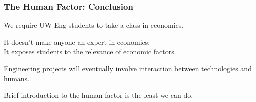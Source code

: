 \begin{frame}
\frametitle{The Human Factor: Conclusion}
\begin{changemargin}{1cm}

We require UW Eng students to take a class in economics.

It doesn't make anyone an expert in economics;\\
\quad It exposes students to the relevance of economic factors.

Engineering projects will eventually involve interaction between technologies and humans.

Brief introduction to the human factor is the least we can do.

\end{changemargin}
\end{frame}



